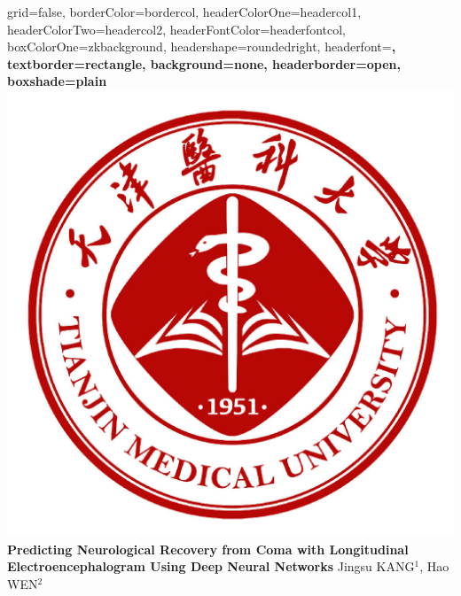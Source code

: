 \documentclass[a0paper,portrait]{baposter}
\begin{document}

\begin{poster}{
grid=false,
borderColor=bordercol, %
headerColorOne=headercol1, %
headerColorTwo=headercol2, %
headerFontColor=headerfontcol, %
boxColorOne=zkbackground,
headershape=roundedright, %
headerfont=\Large\sf\bf, %
textborder=rectangle,
background=none,
headerborder=open, %
boxshade=plain
}
%
%
{\includegraphics[scale=0.103]{logo_tmu.jpeg}} %
{
{\bf \fontsize{19pt}{19pt} \selectfont Predicting Neurological Recovery from Coma with Longitudinal Electroencephalogram Using Deep Neural Networks}
} %
{\vspace{0.3em} \smaller Jingsu KANG$^1$, Hao WEN$^2$  \\  %

}
\end{poster}
\end{document}
